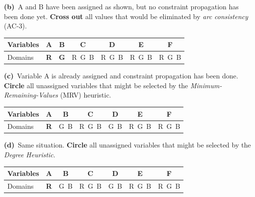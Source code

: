 \documentclass[11pt,a4paper]{article}
\newcommand{\subq}[1]{\par\smallskip\noindent\textbf{#1}\ }
\begin{document}
\subq{(b)}A and B have been assigned as shown, but no constraint propagation has been done yet. \textbf{Cross out} all values that would be eliminated by \emph{arc consistency} (AC-3).\begin{center}\small\begin{tabular}{|l|c|c|c|c|c|c|}\hline Variables & \textbf{A} & \textbf{B} & \textbf{C} & \textbf{D} & \textbf{E} & \textbf{F}\\ \hline Domains & \textbf{R} & \textbf{G} & R\ G\ B & R\ G\ B & R\ G\ B & R\ G\ B\\ \hline\end{tabular}\end{center}

\subq{(c)}Variable A is already assigned and constraint propagation has been done. \textbf{Circle} all unassigned variables that might be selected by the \emph{Minimum-Remaining-Values} (MRV) heuristic.\begin{center}\small\begin{tabular}{|l|c|c|c|c|c|c|}\hline Variables & \textbf{A} & \textbf{B} & \textbf{C} & \textbf{D} & \textbf{E} & \textbf{F}\\ \hline Domains & \textbf{R} & G\ B & R\ G\ B & G\ B & R\ G\ B & R\ G\ B\\ \hline\end{tabular}\end{center}

\subq{(d)}Same situation. \textbf{Circle} all unassigned variables that might be selected by the \emph{Degree Heuristic}.\begin{center}\small\begin{tabular}{|l|c|c|c|c|c|c|}\hline Variables & \textbf{A} & \textbf{B} & \textbf{C} & \textbf{D} & \textbf{E} & \textbf{F}\\ \hline Domains & \textbf{R} & G\ B & R\ G\ B & G\ B & R\ G\ B & R\ G\ B\\ \hline\end{tabular}\end{center}
\end{document}
